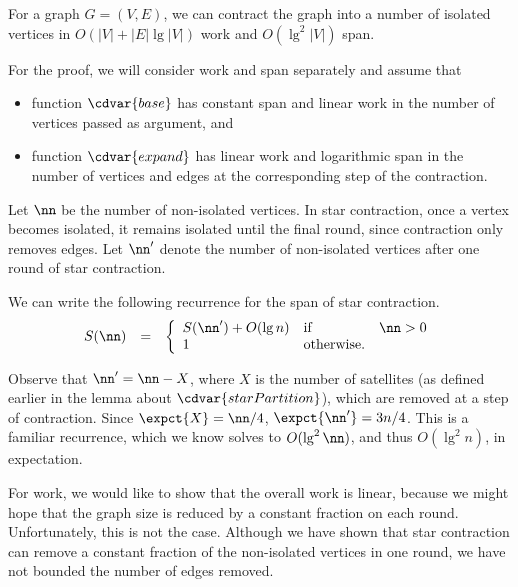 \begin{group}
\begin{theorem}
\label{thm:graphcon::star-contraction-cost}
  For a graph $G = (V,E)$, we can contract the graph into a number of
  isolated vertices   in $O(|V| + |E| \lg |V|)$ work and $O(\lg^2 |V|)$ span.
\end{theorem}

\begin{gram}
For the proof, we will consider work and span separately
%
and assume that
%
\begin{itemize}
   \item function $\cdvar{base}$ has constant span and linear work in the
     number of vertices passed as argument, and
\item function $\cdvar{expand}$ has linear work and logarithmic span in
  the number of vertices and edges at the corresponding step of the
  contraction.
  \end{itemize}

\end{gram}

\begin{gram}
Let $\nn$ be the number of non-isolated vertices.
%
In star contraction, once a vertex becomes isolated, it remains
isolated until the final round, since contraction only removes edges.
%
Let $\nn'$ denote the number of non-isolated vertices after one round of star
contraction.
%

We can write the following recurrence for the span of star contraction.
%
\[
\begin{array}{lll}
S(\nn)  & = &
\left\{
\begin{array}{lll}
S(\nn') + O(\lg n) & \mbox{if} & \nn > 0
\\
1 & \mbox{otherwise.}
\end{array}
\right.
\end{array}
\]
%

Observe that $\nn' = \nn - X$, where $X$ is the number of satellites
(as defined earlier in the lemma about $\cdvar{starPartition}$), which are
removed at a step of contraction. Since $\expct{X} = \nn/4$,
$\expct{\nn'} = 3n/4$.
%
This is a familiar recurrence, which we know solves to $O(\lg^2
\nn)$, and thus $O(\lg^2 n)$, in expectation.
\end{gram}


\begin{gram}
For work, we would like to show that the overall work is linear,
because we might hope that the graph size is reduced by a constant
fraction on each round.
%
Unfortunately, this is not the case.  Although we have shown that star
contraction can remove a constant fraction of the non-isolated
vertices in one round, we have not bounded the number of edges
removed.
%


\end{gram}
\end{group}
